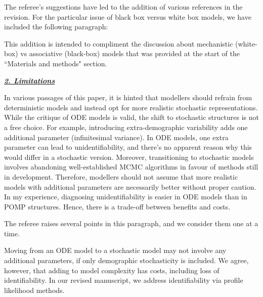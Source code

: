 \documentclass[11pt]{article}
\newcommand\report[1]{{\color{mygreen} \vspace{1mm}\hspace{0.25in}\parbox{6in}{\em #1}}}
\newcommand\article[1]{{\color{blue} \vspace{1mm}\hspace{0.25in}\parbox{6in}{\em #1}}}
\begin{document}
The referee's suggestions have led to the addition of various references in the revision.
For the particular issue of black box versus white box models, we have included the following paragraph:

\article{\editMechModels}

This addition is intended to compliment the discussion about mechanistic (white-box) vs associative (black-box) models that was provided at the start of the ``Materials and methods" section.

\report{
\textbf{\underline{2. Limitations}}

In various passages of this paper, it is hinted that modellers should refrain from deterministic models and instead opt for more realistic stochastic representations. While the critique of ODE models is valid, the shift to stochastic structures is not a free choice. For example, introducing extra-demographic variability adds one additional parameter (infinitesimal variance). In ODE models, one extra parameter can lead to unidentifiability, and there's no apparent reason why this would differ in a stochastic version. Moreover, transitioning to stochastic models involves abandoning well-established MCMC algorithms in favour of methods still in development. Therefore, modellers should not assume that more realistic models with additional parameters are necessarily better without proper caution. In my experience, diagnosing unidentifiability is easier in ODE models than in POMP structures. Hence, there is a trade-off between benefits and costs.
}

The referee raises several points in this paragraph, and we consider them one at a time.

Moving from an ODE model to a stochastic model may not involve any additional parameters, if only demographic stochasticity is included.
We agree, however, that adding to model complexity has costs, including loss of identifiability.
In our revised manuscript, we address identifiability via profile likelihood methods.
\end{document}
